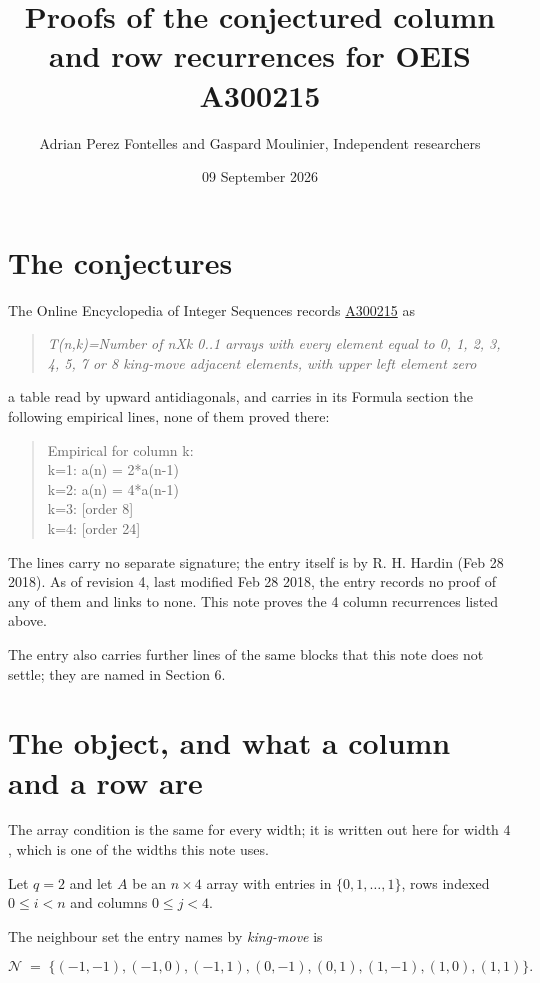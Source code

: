 \documentclass[11pt]{article}
\title{Proofs of the conjectured column and row recurrences for OEIS A300215}
\author{Adrian Perez Fontelles and Gaspard Moulinier, Independent researchers}
\date{09 September 2026}
\theoremstyle{definition}
\begin{document}
\maketitle
\section{The conjectures}

The Online Encyclopedia of Integer Sequences records \href{https://oeis.org/A300215}{A300215} as

\begin{quote}\itshape T(n,k)=Number of nXk 0..1 arrays with every element equal to 0, 1, 2, 3, 4, 5, 7 or 8 king-move adjacent elements, with upper left element zero\end{quote}

a table read by upward antidiagonals, and carries in its Formula section the following empirical lines, none of them proved there:

\begin{quote}\ttfamily Empirical for column k:\\
k=1: a(n) = 2*a(n-1)\\k=2: a(n) = 4*a(n-1)\\k=3: [order 8]\\k=4: [order 24]\end{quote}

The lines carry no separate signature; the entry itself is by R. H. Hardin (Feb 28 2018). As of revision 4, last modified Feb 28 2018, the entry records no proof of any of them and links to none. This note proves the 4 column recurrences listed above.

The entry also carries further lines of the same blocks that this note does not settle; they are named in Section 6.

\section{The object, and what a column and a row are}

The array condition is the same for every width; it is written out here for width $4$, which is one of the widths this note uses.

Let $q = 2$ and let $A$ be an $n \times 4$ array with entries in $\{0,1,\dots,1\}$, rows indexed $0 \le i < n$ and columns $0 \le j < 4$.

The neighbour set the entry names by {\itshape king-move} is

\[\mathcal{N} \;=\; \{(-1,-1), (-1,0), (-1,1), (0,-1), (0,1), (1,-1), (1,0), (1,1)\}.\]
\end{document}
